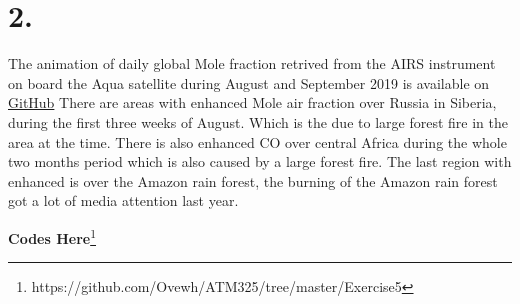 \section*{2.}
The animation of daily global  Mole fraction retrived from the AIRS
instrument on board the Aqua satellite during August and September 2019
is available on
\href{https://github.com/Ovewh/ATM325/tree/master/Exercise5/CO_Global_2019_Aug.gif}{GitHub}
There are areas with enhanced  Mole air fraction 
over Russia in Siberia, during the first three weeks of August. Which is the due
to large forest fire in the area at the time. There is also enhanced CO over
central Africa during the whole two months period which is also caused by a
large forest fire. The last region with enhanced  is over the Amazon rain
forest, the burning of the Amazon rain forest got a lot of media attention last
year.  
 

\textbf{Codes Here}\footnote{https://github.com/Ovewh/ATM325/tree/master/Exercise5}
